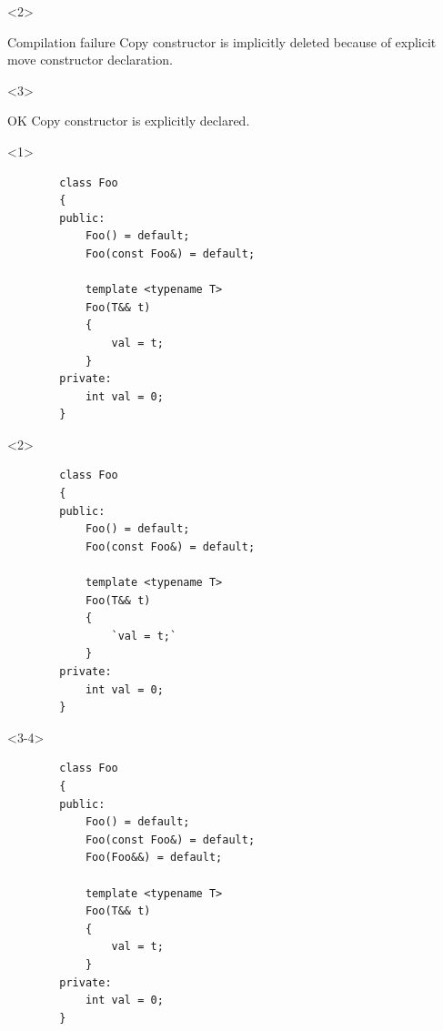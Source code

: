 \documentclass{beamer}
\begin{document}
\begin{frame}[fragile,t]
    \begin{onlyenv}<2>
        \begin{alertblock}{Compilation failure}
            Copy constructor is implicitly deleted because of explicit move constructor declaration.
        \end{alertblock}
    \end{onlyenv}

    \begin{onlyenv}<3>
        \begin{block}{OK}
            Copy constructor is explicitly declared.
        \end{block}
    \end{onlyenv}
\end{frame}

\begin{frame}[fragile,t]
    \begin{onlyenv}<1>
    \begin{lstlisting}
        class Foo
        {
        public:
            Foo() = default;
            Foo(const Foo&) = default;
            
            template <typename T>
            Foo(T&& t)
            {
                val = t;
            }
        private:
            int val = 0;
        }
    \end{lstlisting}
    \end{onlyenv}

    \begin{onlyenv}<2>
    \begin{lstlisting}
        class Foo
        {
        public:
            Foo() = default;
            Foo(const Foo&) = default;
            
            template <typename T>
            Foo(T&& t)
            {
                `val = t;`
            }
        private:
            int val = 0;
        }
    \end{lstlisting}
    \end{onlyenv}

    \begin{onlyenv}<3-4>
    \begin{lstlisting}
        class Foo
        {
        public:
            Foo() = default;
            Foo(const Foo&) = default;
            Foo(Foo&&) = default;
            
            template <typename T>
            Foo(T&& t)
            {
                val = t;
            }
        private:
            int val = 0;
        }
    \end{lstlisting}
    \end{onlyenv}


\end{frame}
\end{document}
